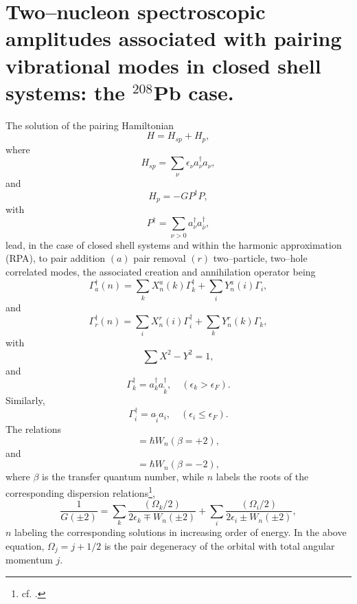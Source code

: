 \section[Pair vibration spectroscopic amplitudes]{Two--nucleon spectroscopic amplitudes associated with pairing vibrational modes in closed shell systems: the $^{208}$Pb case.}\label{App1E}
The solution of the pairing Hamiltonian
\begin{equation*}
H=H_{sp}+H_p,
\end{equation*}
where
\begin{equation*}
H_{sp}=\sum_{\nu}\epsilon_\nu a_\nu^\dagger a_\nu,
\end{equation*}
and 
\begin{equation*}
H_p=-GP^\dagger P,
\end{equation*}
with
\begin{equation*}
P^\dagger=\sum_{\nu>0}a_\nu^\dagger a_{\bar \nu}^\dagger,
\end{equation*}
lead, in the case of closed shell systems and within the harmonic approximation (RPA), to pair addition $(a)$ pair removal $(r)$ two--particle, two--hole correlated modes, the associated creation and annihilation operator being
\begin{equation*}
\Gamma_a^\dagger(n)=\sum_k X_n^a(k)\Gamma_k^\dagger+\sum_iY^a_n(i)\Gamma_i,
\end{equation*}
and
\begin{equation*}
\Gamma_r^\dagger(n)=\sum_i X_n^r(i)\Gamma_i^\dagger+\sum_kY^r_n(k)\Gamma_k,
\end{equation*}
with
\begin{equation*}
\sum X^2-Y^2=1,
\end{equation*}
and
\begin{equation*}
\Gamma_k^\dagger=a_k^\dagger a_{\tilde k}^\dagger,\quad (\epsilon_k>\epsilon_F).
\end{equation*}
Similarly,
\begin{equation*}
\Gamma_i^\dagger=a_{\tilde i} a_i ,\quad (\epsilon_i\leq\epsilon_F).
\end{equation*}
The relations
\begin{equation*}
[H,\Gamma_a^\dagger(n)]=\hbar W_n (\beta=+2),
\end{equation*}
and
\begin{equation*}
[H,\Gamma_r^\dagger(n)]=\hbar W_n (\beta=-2),
\end{equation*}
where $\beta$ is the transfer quantum number, while $n$ labels the roots of the corresponding dispersion relations\footnote{cf. \cite{Bes:66}.}, 
\begin{equation*}
\frac{1}{G(\pm2)}=\sum_k \frac{(\Omega_k/2)}{2\epsilon_k\mp W_n(\pm2)}+\sum_i \frac{(\Omega_i/2)}{2\epsilon_i\pm W_n(\pm2)},
\end{equation*}
$n$ labeling the corresponding solutions in increasing order of energy. In the above equation, $\Omega_j=j+1/2$ is the pair degeneracy of the orbital with total angular momentum $j$.

